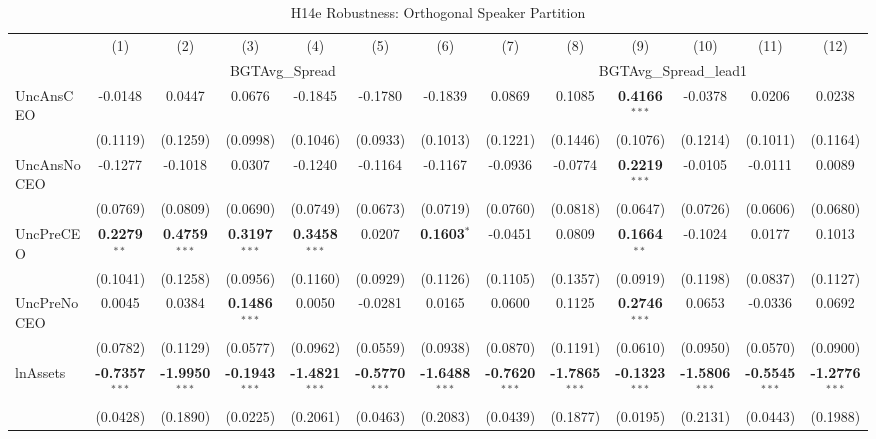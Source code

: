 \documentclass[11pt,a4paper]{article}
\begin{document}
\begin{table}[htbp]
\centering
\caption{H14e Robustness: Orthogonal Speaker Partition}
\label{tab:h14e_robust}
\scriptsize
\begin{tabular}{lcccccccccccc}
\toprule
 & (1) & (2) & (3) & (4) & (5) & (6) & (7) & (8) & (9) & (10) & (11) & (12) \\
 & \multicolumn{6}{c}{BGTAvg\_Spread} & \multicolumn{6}{c}{BGTAvg\_Spread\_lead1} \\
\cmidrule(lr){2-7} \cmidrule(lr){8-13}
\midrule
UncAnsCEO & -0.0148 & 0.0447 & 0.0676 & -0.1845 & -0.1780 & -0.1839 & 0.0869 & 0.1085 & \textbf{0.4166}$^{***}$ & -0.0378 & 0.0206 & 0.0238 \\
 & (0.1119) & (0.1259) & (0.0998) & (0.1046) & (0.0933) & (0.1013) & (0.1221) & (0.1446) & (0.1076) & (0.1214) & (0.1011) & (0.1164) \\
UncAnsNoCEO & -0.1277 & -0.1018 & 0.0307 & -0.1240 & -0.1164 & -0.1167 & -0.0936 & -0.0774 & \textbf{0.2219}$^{***}$ & -0.0105 & -0.0111 & 0.0089 \\
 & (0.0769) & (0.0809) & (0.0690) & (0.0749) & (0.0673) & (0.0719) & (0.0760) & (0.0818) & (0.0647) & (0.0726) & (0.0606) & (0.0680) \\
UncPreCEO & \textbf{0.2279}$^{**}$ & \textbf{0.4759}$^{***}$ & \textbf{0.3197}$^{***}$ & \textbf{0.3458}$^{***}$ & 0.0207 & \textbf{0.1603}$^{*}$ & -0.0451 & 0.0809 & \textbf{0.1664}$^{**}$ & -0.1024 & 0.0177 & 0.1013 \\
 & (0.1041) & (0.1258) & (0.0956) & (0.1160) & (0.0929) & (0.1126) & (0.1105) & (0.1357) & (0.0919) & (0.1198) & (0.0837) & (0.1127) \\
UncPreNoCEO & 0.0045 & 0.0384 & \textbf{0.1486}$^{***}$ & 0.0050 & -0.0281 & 0.0165 & 0.0600 & 0.1125 & \textbf{0.2746}$^{***}$ & 0.0653 & -0.0336 & 0.0692 \\
 & (0.0782) & (0.1129) & (0.0577) & (0.0962) & (0.0559) & (0.0938) & (0.0870) & (0.1191) & (0.0610) & (0.0950) & (0.0570) & (0.0900) \\
\midrule
lnAssets & \textbf{-0.7357}$^{***}$ & \textbf{-1.9950}$^{***}$ & \textbf{-0.1943}$^{***}$ & \textbf{-1.4821}$^{***}$ & \textbf{-0.5770}$^{***}$ & \textbf{-1.6488}$^{***}$ & \textbf{-0.7620}$^{***}$ & \textbf{-1.7865}$^{***}$ & \textbf{-0.1323}$^{***}$ & \textbf{-1.5806}$^{***}$ & \textbf{-0.5545}$^{***}$ & \textbf{-1.2776}$^{***}$ \\
 & (0.0428) & (0.1890) & (0.0225) & (0.2061) & (0.0463) & (0.2083) & (0.0439) & (0.1877) & (0.0195) & (0.2131) & (0.0443) & (0.1988) \\

\end{tabular}
\end{table}
\end{document}
